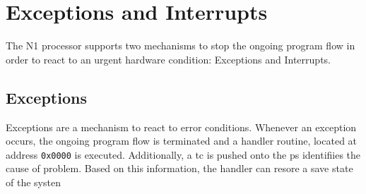 
\section{Exceptions and Interrupts}
\label{excpt}

The N1 processor supports two mechanisms to stop the ongoing program flow in order
to react to an urgent hardware condition: Exceptions and Interrupts.

\subsection{Exceptions}
\label{excpt:general}
Exceptions are a mechanism to react to error conditions. Whenever an exception occurs,
the ongoing program flow is terminated and a handler routine, located at address \texttt{0x0000} 
is executed. Additionally, a \gls{tc} is pushed onto the \gls{ps} identifiies the cause of
problem. Based on this information, the handler can resore a save state of the systen



